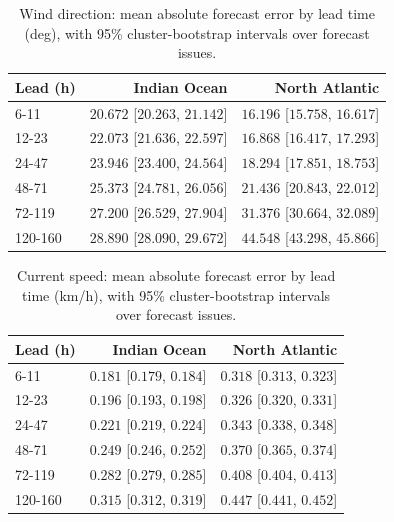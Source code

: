 \documentclass[review,authoryear]{elsarticle}
\begin{document}
\begin{table}[H]
\centering
\caption{Wind direction: mean absolute forecast error by lead time (deg), with 95\%
cluster-bootstrap intervals over forecast issues.}
\label{tab:fe-wind-direction-10m-deg}
\begin{tabular}{lrr}
\toprule
Lead (h) & Indian Ocean & North Atlantic \\
\midrule
6-11 & $20.672$ [$20.263$, $21.142$] & $16.196$ [$15.758$, $16.617$] \\
12-23 & $22.073$ [$21.636$, $22.597$] & $16.868$ [$16.417$, $17.293$] \\
24-47 & $23.946$ [$23.400$, $24.564$] & $18.294$ [$17.851$, $18.753$] \\
48-71 & $25.373$ [$24.781$, $26.056$] & $21.436$ [$20.843$, $22.012$] \\
72-119 & $27.200$ [$26.529$, $27.904$] & $31.376$ [$30.664$, $32.089$] \\
120-160 & $28.890$ [$28.090$, $29.672$] & $44.548$ [$43.298$, $45.866$] \\
\bottomrule
\end{tabular}
\end{table}

\begin{table}[H]
\centering
\caption{Current speed: mean absolute forecast error by lead time (km/h), with 95\%
cluster-bootstrap intervals over forecast issues.}
\label{tab:fe-ocean-current-velocity-kmh}
\begin{tabular}{lrr}
\toprule
Lead (h) & Indian Ocean & North Atlantic \\
\midrule
6-11 & $0.181$ [$0.179$, $0.184$] & $0.318$ [$0.313$, $0.323$] \\
12-23 & $0.196$ [$0.193$, $0.198$] & $0.326$ [$0.320$, $0.331$] \\
24-47 & $0.221$ [$0.219$, $0.224$] & $0.343$ [$0.338$, $0.348$] \\
48-71 & $0.249$ [$0.246$, $0.252$] & $0.370$ [$0.365$, $0.374$] \\
72-119 & $0.282$ [$0.279$, $0.285$] & $0.408$ [$0.404$, $0.413$] \\
120-160 & $0.315$ [$0.312$, $0.319$] & $0.447$ [$0.441$, $0.452$] \\
\bottomrule
\end{tabular}
\end{table}
\end{document}
